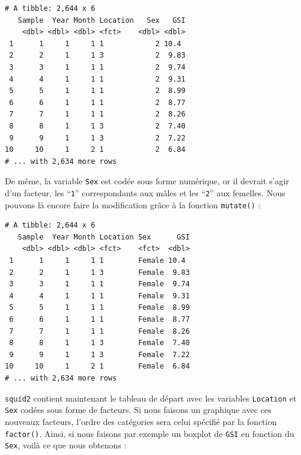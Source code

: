 \documentclass[
  a4paper,
]{article}
\newenvironment{Shaded}{\begin{snugshade}}{\end{snugshade}}
\newcommand{\DataTypeTok}[1]{\textcolor[rgb]{0.00,0.34,0.68}{#1}}
\newcommand{\DecValTok}[1]{\textcolor[rgb]{0.69,0.50,0.00}{#1}}
\newcommand{\KeywordTok}[1]{\textcolor[rgb]{0.12,0.11,0.11}{\textbf{#1}}}
\newcommand{\NormalTok}[1]{\textcolor[rgb]{0.12,0.11,0.11}{#1}}
\newcommand{\OperatorTok}[1]{\textcolor[rgb]{0.12,0.11,0.11}{#1}}
\newcommand{\StringTok}[1]{\textcolor[rgb]{0.75,0.01,0.01}{#1}}
\begin{document}
\begin{verbatim}
# A tibble: 2,644 x 6
   Sample  Year Month Location   Sex   GSI
    <dbl> <dbl> <dbl> <fct>    <dbl> <dbl>
 1      1     1     1 1            2 10.4 
 2      2     1     1 3            2  9.83
 3      3     1     1 1            2  9.74
 4      4     1     1 1            2  9.31
 5      5     1     1 1            2  8.99
 6      6     1     1 1            2  8.77
 7      7     1     1 1            2  8.26
 8      8     1     1 3            2  7.40
 9      9     1     1 3            2  7.22
10     10     1     2 1            2  6.84
# ... with 2,634 more rows
\end{verbatim}

De même, la variable \texttt{Sex} est codée sous forme numérique, or il devrait s'agir d'un facteur, les ``\texttt{1}'' correspondants aux mâles et les ``\texttt{2}'' aux femelles. Nous pouvons là encore faire la modification grâce à la fonction \texttt{mutate()} :

\begin{Shaded}
\end{Shaded}

\begin{verbatim}
# A tibble: 2,644 x 6
   Sample  Year Month Location Sex      GSI
    <dbl> <dbl> <dbl> <fct>    <fct>  <dbl>
 1      1     1     1 1        Female 10.4 
 2      2     1     1 3        Female  9.83
 3      3     1     1 1        Female  9.74
 4      4     1     1 1        Female  9.31
 5      5     1     1 1        Female  8.99
 6      6     1     1 1        Female  8.77
 7      7     1     1 1        Female  8.26
 8      8     1     1 3        Female  7.40
 9      9     1     1 3        Female  7.22
10     10     1     2 1        Female  6.84
# ... with 2,634 more rows
\end{verbatim}

\texttt{squid2} contient maintenant le tableau de départ avec les variables \texttt{Location} et \texttt{Sex} codées sous forme de facteurs. Si nous faisons un graphique avec ces nouveaux facteurs, l'ordre des catégories sera celui spécifié par la fonction \texttt{factor()}. Ainsi, si nous faisons par exemple un boxplot de \texttt{GSI} en fonction du \texttt{Sex}, voilà ce que nous obtenons :
\end{document}
